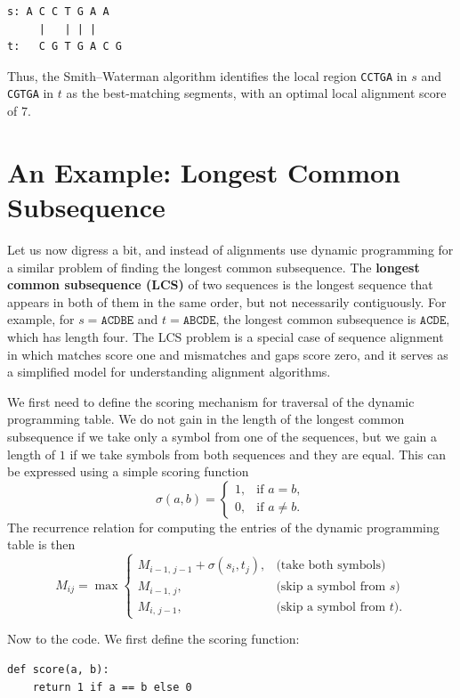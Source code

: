 \begin{verbatim}
s: A C C T G A A
     |   | | |
t:   C G T G A C G
\end{verbatim}

Thus, the Smith--Waterman algorithm identifies the local region \texttt{CCTGA} in $s$ and \texttt{CGTGA} in $t$ as the best-matching segments, with an optimal local alignment score of $7$.


\section{An Example: Longest Common Subsequence}

Let us now digress a bit, and instead of alignments use dynamic programming for a similar problem of finding the longest common subsequence. The \textbf{longest common subsequence (LCS)} of two sequences is the longest sequence that appears in both of them in the same order, but not necessarily contiguously. For example, for $s=\texttt{ACDBE}$ and $t=\texttt{ABCDE}$, the longest common subsequence is $\texttt{ACDE}$, which has length four. The LCS problem is a special case of sequence alignment in which matches score one and mismatches and gaps score zero, and it serves as a simplified model for understanding alignment algorithms.

We first need to define the scoring mechanism for traversal of the dynamic programming table. We do not gain in the length of the longest common subsequence if we take only a symbol from one of the sequences, but we gain a length of $1$ if we take symbols from both sequences and they are equal. This can be expressed using a simple scoring function
\[
\sigma(a,b) =
\begin{cases}
1, & \text{if } a = b,\\[4pt]
0, & \text{if } a \neq b.
\end{cases}
\]
The recurrence relation for computing the entries of the dynamic programming table is then
\[
M_{ij} = \max
\begin{cases}
M_{i-1,\,j-1} + \sigma(s_i, t_j), & \text{(take both symbols)}\\[6pt]
M_{i-1,\,j}, & \text{(skip a symbol from $s$)}\\[6pt]
M_{i,\,j-1}, & \text{(skip a symbol from $t$)}.
\end{cases}
\]

Now to the code. We first define the scoring function:

\vspace*{3mm}
\begin{lstlisting}
def score(a, b):
    return 1 if a == b else 0
\end{lstlisting}

